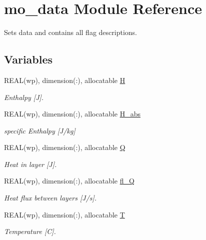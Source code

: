 \hypertarget{namespacemo__data}{
\section{mo\_\-data Module Reference}
\label{namespacemo__data}
}


Sets data and contains all flag descriptions.  


\subsection*{Variables}
\begin{DoxyCompactItemize}
\item 
REAL(wp), dimension(:), allocatable \hyperlink{namespacemo__data_ad27ff95f4bfe7ed6f5643d3953a9310e}{H}
\begin{DoxyCompactList}\small\item\em Enthalpy \mbox{[}J\mbox{]}. \item\end{DoxyCompactList}\item 
REAL(wp), dimension(:), allocatable \hyperlink{namespacemo__data_a763929f604ab797932f22f50a720a1a1}{H\_\-abs}
\begin{DoxyCompactList}\small\item\em specific Enthalpy \mbox{[}J/kg\mbox{]} \item\end{DoxyCompactList}\item 
REAL(wp), dimension(:), allocatable \hyperlink{namespacemo__data_aa221cb1abb5ab4f4d2e8ca7987aeed56}{Q}
\begin{DoxyCompactList}\small\item\em Heat in layer \mbox{[}J\mbox{]}. \item\end{DoxyCompactList}\item 
REAL(wp), dimension(:), allocatable \hyperlink{namespacemo__data_a594603db2866303fb0074ab34692fa4a}{fl\_\-Q}
\begin{DoxyCompactList}\small\item\em Heat flux between layers \mbox{[}J/s\mbox{]}. \item\end{DoxyCompactList}\item 
REAL(wp), dimension(:), allocatable \hyperlink{namespacemo__data_a0969de41af73c828aa2ff388011081ba}{T}
\begin{DoxyCompactList}\small\item\em Temperature \mbox{[}C\mbox{]}. \item\end{DoxyCompactList}\item 

\end{DoxyCompactItemize}
